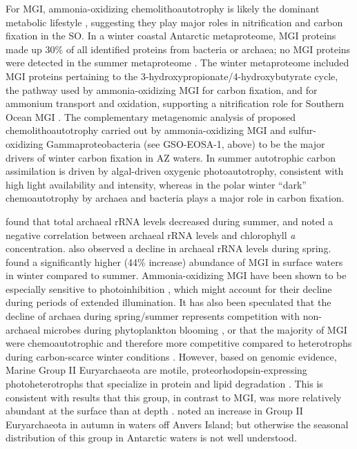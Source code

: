 For \ac{MGI}, ammonia-oxidizing chemolithoautotrophy is likely the dominant metabolic lifestyle \cite{Ingalls:2006kv,Berg:2007fj}, suggesting they play major roles in nitrification and carbon fixation in the \ac{SO}.
In a winter coastal Antarctic metaproteome, \ac{MGI} proteins made up 30\% of all identified proteins from bacteria or archaea; no \ac{MGI} proteins were detected in the summer metaproteome \cite{Williams:2012bs}.
The winter metaproteome included \ac{MGI} proteins pertaining to the 3-hydroxypropionate/4-hydroxybutyrate cycle, the pathway used by ammonia-oxidizing \ac{MGI} for carbon fixation, and for ammonium transport and oxidation, supporting a nitrification role for Southern Ocean \ac{MGI} \cite{Williams:2012bs}.
The complementary metagenomic analysis of \citet{Grzymski:2012ej} proposed chemolithoautotrophy carried out by ammonia-oxidizing \ac{MGI} and sulfur-oxidizing Gammaproteobacteria (see GSO-EOSA-1, above) to be the major drivers of winter carbon fixation in \ac{AZ} waters.
In summer autotrophic carbon assimilation is driven by algal-driven oxygenic photoautotrophy, consistent with high light availability and intensity, whereas in the polar winter ``dark'' chemoautotrophy by archaea and bacteria plays a major role in carbon fixation.

\citet{Murray:1998wy} found that total archaeal rRNA levels decreased during summer, and noted a negative correlation between archaeal rRNA levels and chlorophyll \emph{a} concentration.
\citet{Massana:1998tn} also observed a decline in archaeal rRNA levels during spring.
\citet{Church:2003vt} found a significantly higher (44\% increase) abundance of \ac{MGI} in surface waters in winter compared to summer.
Ammonia-oxidizing \ac{MGI} have been shown to be especially sensitive to photoinhibition \cite{Merbt:2011bl}, which might account for their decline during periods of extended illumination.
It has also been speculated that the decline of archaea during spring/summer represents competition with non-archaeal microbes during phytoplankton blooming \cite{Massana:1998tn}, or that the majority of \ac{MGI} were chemoautotrophic and therefore more competitive compared to heterotrophs during carbon-scarce winter conditions \cite{Murray:1998wy}.
However, based on genomic evidence, Marine Group II Euryarchaeota are motile, proteorhodopsin-expressing photoheterotrophs that specialize in protein and lipid degradation \cite{Iverson:2012kc}.
This is consistent with results that this group, in contrast to \ac{MGI}, was more relatively abundant at the surface than at depth \cite{Massana:1998tn}.
\citet{Murray:1998wy} noted an increase in Group II Euryarchaeota in autumn in waters off Anvers Island; but otherwise the seasonal distribution of this group in Antarctic waters is not well understood.

